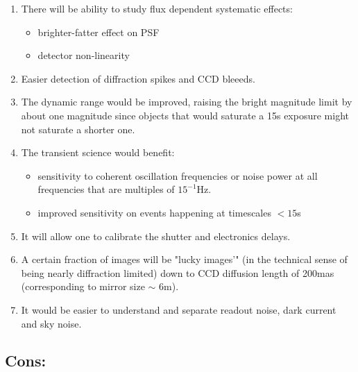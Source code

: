 \documentclass[12pt, a4paper]{article}
\begin{document}
\begin{enumerate}

\item There will be ability to study flux dependent systematic effects:
  \begin{itemize}
  \item brighter-fatter effect on PSF
  \item detector non-linearity
\end{itemize}

\item Easier detection of diffraction spikes and CCD bleeeds.

\item The  dynamic range would be improved, raising the bright
  magnitude limit by about one magnitude since objects that would saturate a 15s
  exposure might not saturate a shorter one.

\item The transient science would benefit:
  \begin{itemize}
  \item sensitivity to coherent oscillation frequencies or noise power at all
    frequencies that are multiples  of $15^{-1}$Hz.
  \item improved sensitivity on events happening at timescales $<15$s 
  \end{itemize}

\item It will allow one to calibrate the shutter and electronics delays.

\item A certain fraction of images will be "lucky images'" (in the
  technical sense of being nearly diffraction limited) down to
  CCD diffusion length of 200mas (corresponding to mirror size $\sim$
  6m).

\item It would be easier to understand and separate readout noise, dark
  current and sky noise.

\end{enumerate}

\subsection*{Cons:}
\end{document}
